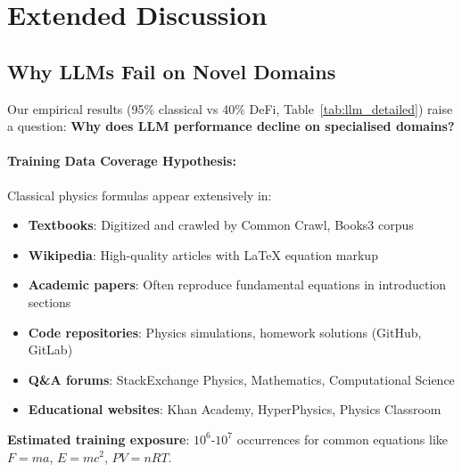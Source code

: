 \documentclass[11pt,a4paper]{article}
\begin{document}



\section{Extended Discussion}
\label{app:extended_discussion}

\subsection{Why LLMs Fail on Novel Domains}

Our empirical results (95\% classical vs 40\% DeFi, Table~\ref{tab:llm_detailed}) raise a question: \textbf{Why does LLM performance decline on specialised domains?}\citep{kambhampati2024llms}

\paragraph{Training Data Coverage Hypothesis:}

Classical physics formulas appear extensively in:
\begin{itemize}
\item \textbf{Textbooks}: Digitized and crawled by Common Crawl, Books3 corpus
\item \textbf{Wikipedia}: High-quality articles with LaTeX equation markup
\item \textbf{Academic papers}: Often reproduce fundamental equations in introduction sections
\item \textbf{Code repositories}: Physics simulations, homework solutions (GitHub, GitLab)
\item \textbf{Q\&A forums}: StackExchange Physics, Mathematics, Computational Science
\item \textbf{Educational websites}: Khan Academy, HyperPhysics, Physics Classroom
\end{itemize}

\textbf{Estimated training exposure}: $10^6$-$10^7$ occurrences for common equations like $F = ma$, $E = mc^2$, $PV = nRT$.
\end{document}
